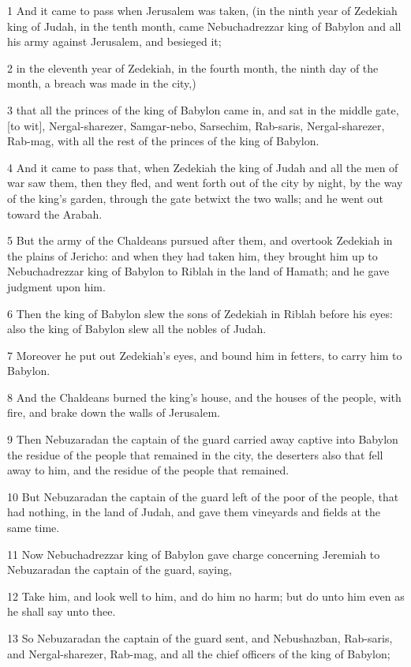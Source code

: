 \par 1 And it came to pass when Jerusalem was taken, (in the ninth year of Zedekiah king of Judah, in the tenth month, came Nebuchadrezzar king of Babylon and all his army against Jerusalem, and besieged it;
\par 2 in the eleventh year of Zedekiah, in the fourth month, the ninth day of the month, a breach was made in the city,)
\par 3 that all the princes of the king of Babylon came in, and sat in the middle gate, [to wit], Nergal-sharezer, Samgar-nebo, Sarsechim, Rab-saris, Nergal-sharezer, Rab-mag, with all the rest of the princes of the king of Babylon.
\par 4 And it came to pass that, when Zedekiah the king of Judah and all the men of war saw them, then they fled, and went forth out of the city by night, by the way of the king's garden, through the gate betwixt the two walls; and he went out toward the Arabah.
\par 5 But the army of the Chaldeans pursued after them, and overtook Zedekiah in the plains of Jericho: and when they had taken him, they brought him up to Nebuchadrezzar king of Babylon to Riblah in the land of Hamath; and he gave judgment upon him.
\par 6 Then the king of Babylon slew the sons of Zedekiah in Riblah before his eyes: also the king of Babylon slew all the nobles of Judah.
\par 7 Moreover he put out Zedekiah's eyes, and bound him in fetters, to carry him to Babylon.
\par 8 And the Chaldeans burned the king's house, and the houses of the people, with fire, and brake down the walls of Jerusalem.
\par 9 Then Nebuzaradan the captain of the guard carried away captive into Babylon the residue of the people that remained in the city, the deserters also that fell away to him, and the residue of the people that remained.
\par 10 But Nebuzaradan the captain of the guard left of the poor of the people, that had nothing, in the land of Judah, and gave them vineyards and fields at the same time.
\par 11 Now Nebuchadrezzar king of Babylon gave charge concerning Jeremiah to Nebuzaradan the captain of the guard, saying,
\par 12 Take him, and look well to him, and do him no harm; but do unto him even as he shall say unto thee.
\par 13 So Nebuzaradan the captain of the guard sent, and Nebushazban, Rab-saris, and Nergal-sharezer, Rab-mag, and all the chief officers of the king of Babylon;
